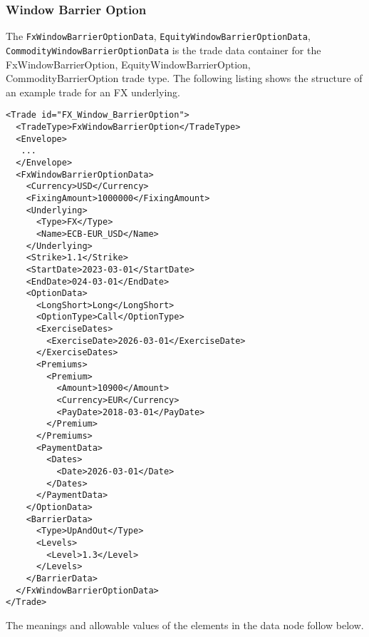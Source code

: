 \subsubsection{Window Barrier Option}

\ifdefined{}\fi

The \verb+FxWindowBarrierOptionData+, \verb+EquityWindowBarrierOptionData+, \verb+CommodityWindowBarrierOptionData+ is
the trade data container for the FxWindowBarrierOption, EquityWindowBarrierOption, CommodityBarrierOption trade
type. The following listing shows the structure of an example trade for an FX underlying.

\begin{verbatim}
<Trade id="FX_Window_BarrierOption">
  <TradeType>FxWindowBarrierOption</TradeType>
  <Envelope>
   ...
  </Envelope>
  <FxWindowBarrierOptionData>
    <Currency>USD</Currency>
    <FixingAmount>1000000</FixingAmount>
    <Underlying>
      <Type>FX</Type>
      <Name>ECB-EUR_USD</Name>
    </Underlying>
    <Strike>1.1</Strike>
    <StartDate>2023-03-01</StartDate>
    <EndDate>024-03-01</EndDate>
    <OptionData>
      <LongShort>Long</LongShort>
      <OptionType>Call</OptionType>
      <ExerciseDates>
        <ExerciseDate>2026-03-01</ExerciseDate>
      </ExerciseDates>
      <Premiums>
        <Premium>
          <Amount>10900</Amount>
          <Currency>EUR</Currency>
          <PayDate>2018-03-01</PayDate>
        </Premium>
      </Premiums>
      <PaymentData>
        <Dates>
          <Date>2026-03-01</Date>
        </Dates>
      </PaymentData>
    </OptionData>
    <BarrierData>
      <Type>UpAndOut</Type>
      <Levels>
        <Level>1.3</Level>
      </Levels>
    </BarrierData>
  </FxWindowBarrierOptionData>
</Trade>
\end{verbatim}

The meanings and allowable values of the elements in the data node follow below.

